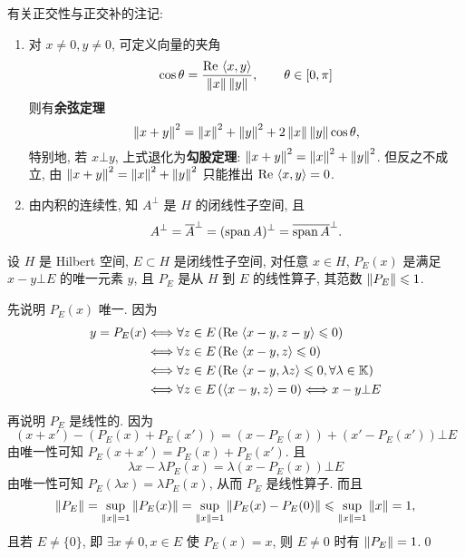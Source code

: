     \begin{Remark}\label{rmk:正交性与正交补}
        有关正交性与正交补的注记:
        \begin{enumerate}[(1)]
            \item 对 $ x\ne0, y\ne 0 $, 可定义向量的夹角
            \[
                \cos\theta=\frac{\mathrm{Re\,}\left\langle x, y \right\rangle}{\left\| x \right\|\left\| y \right\|},\qquad \theta\in[0, \pi]
            \]
            则有\textbf{余弦定理}
            \[
                \left\| x+y \right\|^{2}=\left\| x \right\|^{2}+\left\| y \right\|^{2}+2\left\| x \right\|\left\| y \right\|\cos\theta,
            \]
            特别地, 若 $ x\bot y $, 上式退化为\textbf{勾股定理}: $ \left\| x+y \right\|^{2}=\left\| x \right\|^{2}+\left\| y \right\|^{2} $. 但反之不成立, 由 $ \left\| x+y \right\|^{2}=\left\| x \right\|^{2}+\left\| y \right\|^{2} $ 只能推出 $ \mathrm{Re\,}\left\langle x, y \right\rangle= 0 $.
            \item 由内积的连续性, 知 $ A^{\bot} $ 是 $ H $ 的闭线性子空间, 且
            \[
                A^{\bot}=\overline{A}^{\bot}=(\operatorname{span} A)^{\bot}=\overline{\operatorname{span} A}^{\bot}.
            \]
        \end{enumerate}
    \end{Remark}    
    
        \begin{Theorem}[投影线性算子]
             设 $ H $ 是 Hilbert 空间, $ E\subset H $ 是闭线性子空间,  对任意 $ x\in H $, $ P_{E}(x) $ 是满足 $ x- y\bot E $ 的唯一元素 $ y $, 且 $ P_{E} $ 是从 $ H $ 到 $ E $ 的线性算子, 其范数 $ \left\| P_{E} \right\|\leqslant1 $.
        \end{Theorem}
            
        \begin{Proof}
            先说明 $ P_{E}(x) $ 唯一. 因为
            \[
                \begin{aligned}
                    y=P_{E}(x) & \Longleftrightarrow \forall z\in E\,(\mathrm{Re\,}\left\langle x-y, z-y \right\rangle\leqslant0)\\
                    & \Longleftrightarrow \forall z\in E\,(\mathrm{Re\,}\left\langle x-y, z \right\rangle\leqslant0)\\
                    & \Longleftrightarrow \forall z\in E\,(\mathrm{Re\,}\left\langle x-y, \lambda z \right\rangle\leqslant0, \forall \lambda\in \mathbb{K})\\
                    & \Longleftrightarrow \forall z\in E\,(\left\langle x-y, z \right\rangle=0)\Longleftrightarrow x-y\bot E
                \end{aligned}
            \]

            再说明 $ P_{E} $ 是线性的. 因为
            \[
                (x+x')-(P_{E}(x)+P_{E}(x'))=(x-P_{E}(x))+(x'-P_{E}(x'))\bot E
            \]
            由唯一性可知 $ P_{E}(x+x')=P_{E}(x)+P_{E}(x') $. 且
            \[
                \lambda x-\lambda P_{E}(x)=\lambda(x-P_{E}(x))\bot E
            \]
            由唯一性可知 $ P_{E}(\lambda x)=\lambda P_{E}(x) $, 从而 $ P_{E} $ 是线性算子. 而且
            \[
                \left\| P_{E} \right\|=\sup_{\left\| x \right\|=1}\left\| P_{E}(x) \right\|=\sup_{\left\| x \right\|=1}\left\| P_{E}(x)-P_{E}(0) \right\|\leqslant\sup_{\left\| x \right\|=1}\left\| x \right\|=1,
            \]
            且若 $ E\ne \{ 0 \} $, 即 $ \exists x\ne 0, x\in E $ 使 $ P_{E}(x)=x $, 则 $ E\ne 0 $ 时有 $ \left\| P_{E} \right\|=1 $.\qed
        \end{Proof}
         
